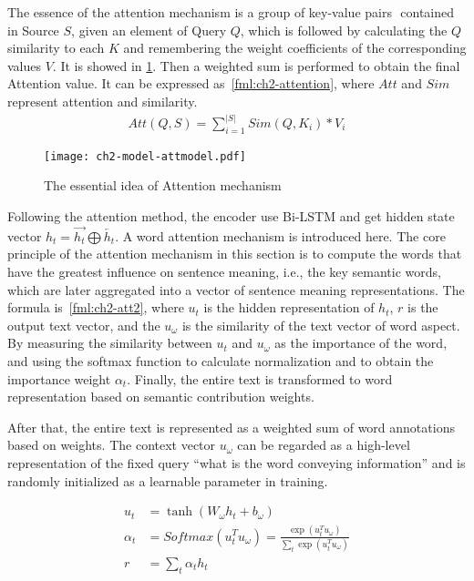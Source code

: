 The essence of the attention mechanism is a group of key-value pairs \(<K, V>\) contained in Source \(S\), given an element of Query \(Q\), which is followed by calculating the \(Q\) similarity to each \(K\) and remembering the weight coefficients of the corresponding values \(V\). It is showed in \figurename{\ref{fig:ch2-model-attmodel}}. Then a weighted sum is performed to obtain the final Attention value. It can be expressed as~\ref{fml:ch2-attention}, where \(Att\) and \(Sim\) represent attention and similarity.
\begin{align}\label{fml:ch2-attention}
	Att(Q,S) = \sum_{i=1}^{|S|}Sim(Q,K_i)*V_i
\end{align}


\begin{figure}[H]
	\centering
	\texttt{[image: ch2-model-attmodel.pdf]}
	\caption{The essential idea of Attention mechanism}\label{fig:ch2-model-attmodel}
\end{figure}


Following the attention method, the encoder use Bi-LSTM and get hidden state vector \(h_t=\overrightarrow{h_t}\bigoplus \overleftarrow{h_t}\). A word attention mechanism is introduced here. The core principle of the attention mechanism in this section is to compute the words that have the greatest influence on sentence meaning, i.e., the key semantic words, which are later aggregated into a vector of sentence meaning representations. The formula is~\ref{fml:ch2-att2}, where \(u_t\) is the hidden representation of \(h_t\), \(r\) is the output text vector, and the \(u_\omega \) is the similarity of the text vector of word aspect. By measuring the similarity between \(u_t\) and \(u_\omega \) as the importance of the word, and using the softmax function to calculate normalization and to obtain the importance weight \(\alpha_{t}\). Finally, the entire text is transformed to word representation based on semantic contribution weights.

%
After that, the entire text is represented as a weighted sum of word annotations based on weights. The context vector \(u_\omega \) can be regarded as a high-level representation of the fixed query ``what is the word conveying information'' and is randomly initialized as a learnable parameter in training.

\begin{equation}
	\begin{align}\label{fml:ch2-att2}
		u_t      & = \tanh(W_\omega h_t + b_\omega )                                                    \\
		\alpha_t & =Softmax(u_t^T u_\omega) = \frac{\exp( u_t^T u_\omega)}{\sum_t \exp(u_t^T u_\omega)} \\
		r        & = \sum_t{\alpha_t h_t}
	\end{align}
\end{equation}


